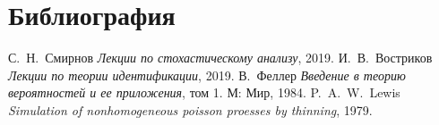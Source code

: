 \documentclass[oneside, final, 12pt]{article}
\begin{document}
\section{Библиография}
	\begin{thebibliography}{99}
		 С.~Н.~Смирнов \textit{Лекции по стохастическому анализу}, 2019.
		 И.~В.~Востриков \textit{Лекции по теории идентификации}, 2019.
		 В.~Феллер \textit{Введение в теорию вероятностей и ее приложения}, 
			том 1. М: Мир, 1984.
		 P.~A.~W.~Lewis \textit{Simulation of nonhomogeneous poisson proesses by thinning}, 1979.
	\end{thebibliography}
\end{document}
